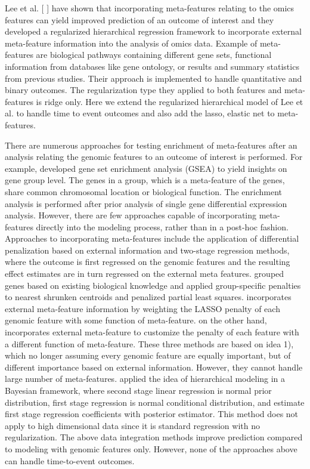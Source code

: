 Lee et al. [ ] have shown that incorporating meta-features relating to the omics features can yield improved prediction of an outcome of interest and they developed a regularized hierarchical regression framework to incorporate external meta-feature information into the analysis of omics data. Example of meta-features are biological pathways containing different gene sets, functional information from databases like gene ontology, or results and summary statistics from previous studies. Their approach is implemented to handle quantitative and binary outcomes. The regularization type they applied to both features and meta-features is ridge only. Here we extend the regularized hierarchical model of Lee et al. to handle time to event outcomes and also add the lasso, elastic net to meta-features.

There are numerous approaches for testing enrichment of meta-features after an analysis relating the genomic features to an outcome of interest is performed. For example, \cite{subramanian2005gene} developed gene set enrichment analysis (GSEA) to yield insights on gene group level. The genes in a group, which is a meta-feature of the genes, share common chromosomal location or biological function. The enrichment analysis is performed after prior analysis of single gene differential expression analysis. However, there are few approaches capable of incorporating meta-features directly into the modeling process, rather than in a post-hoc fashion.  Approaches to incorporating meta-features include the application of differential penalization based on external information and two-stage regression methods, where the outcome is first regressed on the genomic features and the resulting effect estimates are in turn regressed on the external meta features. \cite{tai2007incorporating} grouped genes based on existing biological knowledge and applied group-specific penalties to nearest shrunken centroids and penalized partial least squares. \cite{bergersen2011weighted} incorporates external meta-feature information by weighting the LASSO penalty of each genomic feature with some function of meta-feature. \cite{zeng2021incorporating} on the other hand, incorporates external meta-feature to customize the penalty of each feature with a different function of meta-feature. These three methods are based on idea 1), which no longer assuming every genomic feature are equally important, but of different importance based on external information. However, they cannot handle large number of meta-features. \cite{chen2007enriching} applied the idea of hierarchical modeling in a Bayesian framework, where second stage linear regression is normal prior distribution, first stage regression is normal conditional distribution, and estimate first stage regression coefficients with posterior estimator. This method does not apply to high dimensional data since it is standard regression with no regularization. The above data integration methods improve prediction compared to modeling with genomic features only. However, none of the approaches above can handle time-to-event outcomes.

